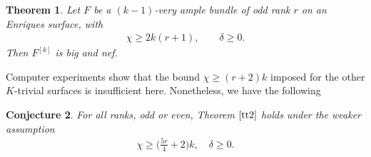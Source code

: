 \documentclass[10pt,a4paper]{amsart}
\numberwithin{equation}{section}
\newtheorem{Theorem}{Theorem}[section]
\newtheorem{Conjecture}[Theorem]{Conjecture}
\begin{document}
\begin{Theorem}\label{tt2}
Let $F$ be a $(k-1)$-very ample bundle of odd rank $r$ on an Enriques surface, with
\begin{gather*}
\chi\geq 2k (r+1), \qquad \delta\geq 0.
\end{gather*}
Then $F^{[k]}$ is big and nef.
\end{Theorem}
Computer experiments show that the bound $\chi\geq (r+2)k$ imposed for the other $K$-trivial surfaces is insufficient here. Nonetheless, we have the following

\begin{Conjecture}
For all ranks, odd or even, Theorem $\ref{tt2}$ holds under the weaker assumption
\begin{gather*}
\chi\geq \biggl(\frac{5r}{4}+2\biggr)k,\quad \delta\geq 0.
\end{gather*}
\end{Conjecture}
\end{document}
